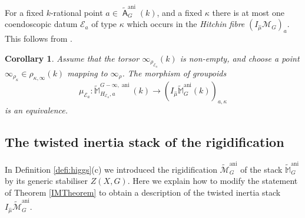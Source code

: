 \documentclass{article}
\DeclareMathOperator{\A}{\mathsf{A}}
\DeclareMathOperator{\ani}{ani}
\DeclareMathOperator{\Zb}{\mathbb{Z}}
\DeclareMathOperator{\Xb}{\mathbb{X}}
\DeclareMathOperator{\Tb}{\mathbb{T}}
\newcommand{\Mc}{\mathcal{M}}
\DeclareMathOperator{\Qb}{\mathbb{Q}}
\newcommand{\BM}{{\mathbb{M}}}
\newcommand{\CE}{{\mathcal E}}
\newcommand{\wac}{\widetilde{\A} }
\theoremstyle{definition}
\theoremstyle{plain}
\newtheorem{corollary}[definition]{Corollary}
\begin{document}
For a fixed $k$-rational point $a \in \wac^{\ani}_G(k)$, and a fixed $\kappa$ there is at most one coendoscopic datum $\CE_a$ of type $\kappa$ which occurs in the \emph{Hitchin fibre} $(I_{\hat\mu}\Mc_G)_{a}$. This follows from \cite[Proposition 6.3.3]{MR2653248}.

\begin{corollary}\label{kappa_IMTheorem}
Assume that the torsor $\infty_{\rho_{\CE_a}}(k)$ is non-empty, and choose a point $\infty_{\rho_\kappa} \in \rho_{\kappa,\infty}(k)$ mapping to $\infty_\rho$. The morphism of groupoids
\begin{equation*}
 \mu_{\CE_a} \colon  \widetilde{\BM}^{G-\infty,\ani}_{H_{\CE_a},a}(k) \to \left(I_{\hat\mu}\widetilde{\BM}^{\ani}_G(k)\right)_{a,\kappa}
\end{equation*}
is an equivalence.
\end{corollary} 



\subsection{The twisted inertia stack of the rigidification}
In Definition \ref{defi:higgs}(c) we introduced the rigidification $\widetilde{\Mc}^{\ani}_G$ of the stack $\widetilde{\BM}^{\ani}_G$ by its generic stabiliser $Z(X,G)$. Here we explain how to modify the statement of Theorem \ref{IMTheorem} to obtain a description of the twisted inertia stack $I_{\hat\mu} \widetilde{\mathcal{M}}^{\ani}_G$.
\end{document}

